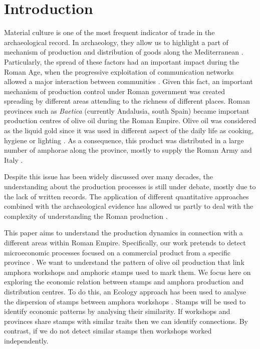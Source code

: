 \documentclass[review]{elsarticle}
\begin{document}
\section{Introduction}


Material culture is one of the most frequent indicator of trade in the archaeological record. In archaeology, they allow us to highlight a part of mechanism of production and distribution of goods along the Mediterranean \citep{bevan_mediterranean_2014}. Particularly, the spread of these factors had an important impact during the Roman Age, when the progressive exploitation of communication networks allowed a major interaction between communities \citep{orengo_seeds_2016}. Given this fact, an important mechanism of production control under Roman government was created spreading by different areas attending to the richness of different places. Roman provinces such as \textit{Baetica} (currently Andalusia, south Spain) became important production centres of olive oil during the Roman Empire. Olive oil was considered as the liquid gold since it was used in different aspect of the daily life as cooking, hygiene or lighting  \citep{mattingly_d.j._oil_1988}. As a consequence, this product was distributed in a large number of amphorae along the province, mostly to supply the Roman Army and Italy \citep{blazquez_exportacion_1980}. 


Despite this issue has been widely discussed over many decades, the understanding about the production processes is still under debate, mostly due to the lack of written records. The application of different quantitative approaches combined with the archaeological evidence has allowed us partly to deal with the complexity of understanding the Roman production \citep{orengo_seeds_2016,
brughmans_roman_2016,coto-sarmiento_identifying_2018,bayesian_2018}.


This paper aims to understand the production dynamics in connection with a different areas within Roman Empire. Specifically, our work pretends to detect microeconomic processes focused on a commercial product from a specific province \citep{isaksen_network_2006}. We want to understand the pattern of olive oil production that link amphora workshops and amphoric stamps used to mark them. We focus here on exploring the economic relation between stamps and amphora production and distribution centres. To do this, an Ecology approach has been used to analyse the dispersion of stamps between amphora workshops \citep{rubio-campillo_ecology_2018}. Stamps will be used to identify economic patterns by analysing their similarity. If workshops and provinces share stamps with similar traits then we can identify connections. By contrast, if we do not detect similar stamps then workshops worked independently. 
\end{document}
